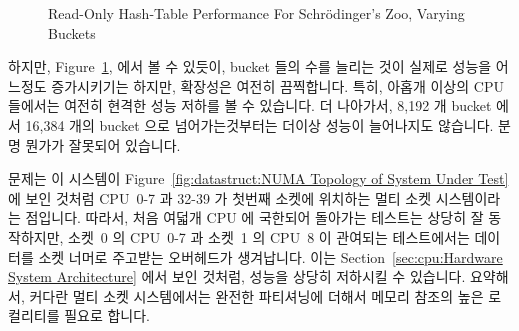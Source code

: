 \begin{figure}[tb]
\centering
{}
\caption{Read-Only Hash-Table Performance For Schr\"odinger's Zoo, Varying Buckets}
\label{fig:datastruct:Read-Only Hash-Table Performance For Schroedinger's Zoo, Varying Buckets}
\end{figure}

하지만,
Figure~\ref{fig:datastruct:Read-Only Hash-Table Performance For Schroedinger's Zoo, Varying Buckets},
에서 볼 수 있듯이, bucket 들의 수를 늘리는 것이 실제로 성능을 어느정도
증가시키기는 하지만, 확장성은 여전히 끔찍합니다.
특히, 아홉개 이상의 CPU 들에서는 여전히 현격한 성능 저하를 볼 수 있습니다.
더 나아가서, 8,192 개 bucket 에서 16,384 개의 bucket 으로 넘어가는것부터는
더이상 성능이 늘어나지도 않습니다.
분명 뭔가가 잘못되어 있습니다.

문제는 이 시스템이
Figure~\ref{fig:datastruct:NUMA Topology of System Under Test} 에 보인 것처럼
CPU~0-7 과 32-39 가 첫번째 소켓에 위치하는 멀티 소켓 시스템이라는 점입니다.
따라서, 처음 여덟개 CPU 에 국한되어 돌아가는 테스트는 상당히 잘 동작하지만,
소켓~0 의 CPU~0-7 과 소켓~1 의 CPU~8 이 관여되는 테스트에서는 데이터를 소켓
너머로 주고받는 오버헤드가 생겨납니다.
이는
Section~\ref{sec:cpu:Hardware System Architecture} 에서 보인 것처럼, 성능을
상당히 저하시킬 수 있습니다.
요약해서, 커다란 멀티 소켓 시스템에서는 완전한 파티셔닝에 더해서 메모리 참조의
높은 로컬리티를 필요로 합니다.
\iffalse


